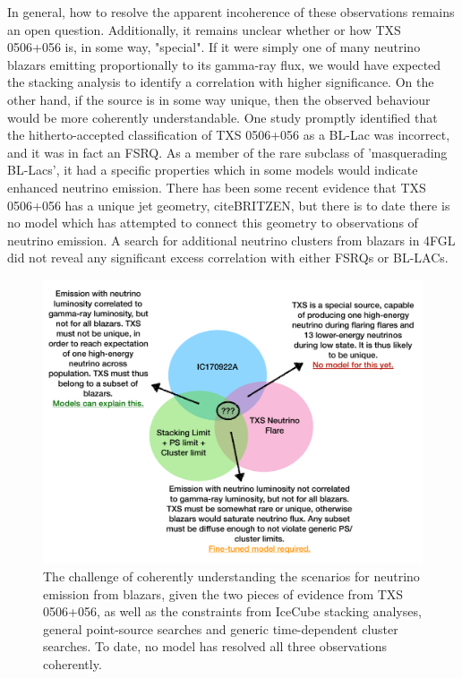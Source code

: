  In general, how to resolve the apparent incoherence of these observations remains an open question. Additionally, it remains unclear whether or how TXS 0506+056 is, in some way, "special". If it were simply one of many neutrino blazars emitting proportionally to its gamma-ray flux, we would have expected the stacking analysis to identify a correlation with higher significance.  On the other hand, if the source is in some way unique, then the observed behaviour would be more coherently understandable. One study promptly identified that the hitherto-accepted classification of TXS 0506+056 as a BL-Lac was incorrect, and it was in fact an FSRQ. As a member of the rare subclass of 'masquerading BL-Lacs', it had a specific properties which in some models would indicate enhanced neutrino emission. There has been some recent evidence that TXS 0506+056 has a unique jet geometry, citeBRITZEN, but there is to date there is no model which has attempted to connect this geometry to observations of neutrino emission. A search for additional neutrino clusters from blazars in 4FGL did not reveal any significant excess correlation with either FSRQs or BL-LACs.
 
 \begin{figure}[!ht]
 	\centering \includegraphics{txs_logic}
 	\caption{The challenge of coherently understanding the scenarios for neutrino emission from blazars, given the two pieces of evidence from TXS 0506+056, as well as the constraints from IceCube stacking analyses, general point-source searches and generic time-dependent cluster searches. To date, no model has resolved all three observations coherently.}
 	\label{fig:TXSLogic}
 \end{figure}
